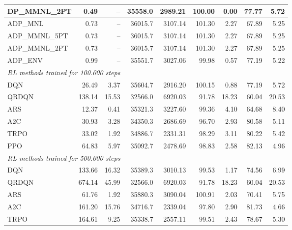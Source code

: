 \begin{samepage}
\begin{center}
\begin{tabular}{l|rr|rr|rr|rr}
    DP\_MMNL\_2PT &     0.49 &    -- &    35558.0 &    2989.21 &  100.00 &    0.00 &   77.77 &    5.72 \\
    \midrule
    ADP\_MNL     &     0.73 &    -- &    36015.7 &    3107.14 &  101.30 &    2.27 &   67.89 &    5.25 \\
    ADP\_MMNL\_5PT &     0.73 &    -- &    36015.7 &    3107.14 &  101.30 &    2.27 &   67.89 &    5.25 \\
    ADP\_MMNL\_2PT &     0.73 &    -- &    36015.7 &    3107.14 &  101.30 &    2.27 &   67.89 &    5.25 \\
    ADP\_ENV     &     0.99 &    -- &    35551.7 &    3027.06 &   99.98 &    0.57 &   77.19 &    5.22 \\
    \midrule
    \multicolumn{9}{l}{\textit{RL methods trained for 100.000 steps}} \\
    \midrule
    DQN          &    26.49 &     3.37 &    35604.7 &    2916.20 &  100.15 &    0.88 &   77.19 &    5.72 \\
    QRDQN        &   138.14 &    15.53 &    32566.0 &    6920.03 &   91.78 &   18.23 &   60.04 &   20.53 \\
    ARS          &    12.37 &     0.41 &    35321.3 &    3227.60 &   99.36 &    4.10 &   64.68 &    8.40 \\
    A2C          &    30.93 &     3.28 &    34350.3 &    2686.69 &   96.70 &    2.93 &   80.58 &    5.11 \\
    TRPO         &    33.02 &     1.92 &    34886.7 &    2331.31 &   98.29 &    3.11 &   80.22 &    5.42 \\
    PPO          &    64.83 &     5.97 &    35092.7 &    2478.69 &   98.83 &    2.58 &   82.13 &    4.96 \\
    \midrule
    \multicolumn{9}{l}{\textit{RL methods trained for 500.000 steps}} \\
    \midrule
    DQN          &   133.66 &    16.32 &    35389.3 &    3010.13 &   99.53 &    1.17 &   74.56 &    6.99 \\
    QRDQN        &   674.14 &    45.99 &    32566.0 &    6920.03 &   91.78 &   18.23 &   60.04 &   20.53 \\
    ARS          &    61.76 &     1.92 &    35880.3 &    3090.04 &  100.91 &    2.03 &   70.41 &    5.75 \\
    A2C          &   161.20 &    15.76 &    34716.7 &    2339.04 &   97.80 &    2.90 &   81.73 &    4.66 \\
    TRPO         &   164.61 &     9.25 &    35338.7 &    2557.11 &   99.51 &    2.43 &   78.67 &    5.30 \\

\end{tabular}
\end{center}
\end{samepage}
